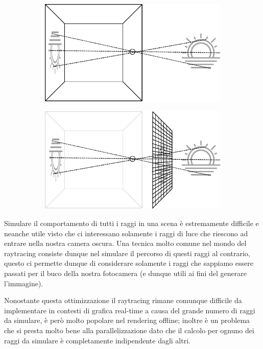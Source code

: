 \documentclass[12pt, twoside]{article}
\begin{document}
\begin{figure}[h]
  \centering
  \begin{subfigure}{.4\textwidth}
    \includegraphics[width=\linewidth]{images/PinholeCamera.pdf}
  \end{subfigure}
  \hspace{0.1\textwidth}
  \begin{subfigure}{.4\textwidth}
    \includegraphics[width=\linewidth]{images/PinholeFocalPlane.pdf}
  \end{subfigure}
\end{figure}

Simulare il comportamento di tutti i raggi in una scena è estremamente
difficile e neanche utile visto che ci interessano solamente i raggi di luce
che riescono ad entrare nella nostra camera oscura.
Una tecnica molto comune nel mondo del raytracing consiste dunque nel simulare
il percorso di questi raggi al contrario, questo ci permette dunque di
considerare solamente i raggi che sappiamo essere passati per il buco della
nostra fotocamera (e dunque utili ai fini del generare l'immagine). 

Nonostante questa ottimizzazione il raytracing rimane comunque difficile da
implementare in contesti di grafica real-time a causa del grande numero di
raggi da simulare, è però molto popolare nel rendering offline; inoltre è un
problema che si presta molto bene alla parallelizzazione dato che il calcolo
per ognuno dei raggi da simulare è completamente indipendente dagli altri.
\end{document}

